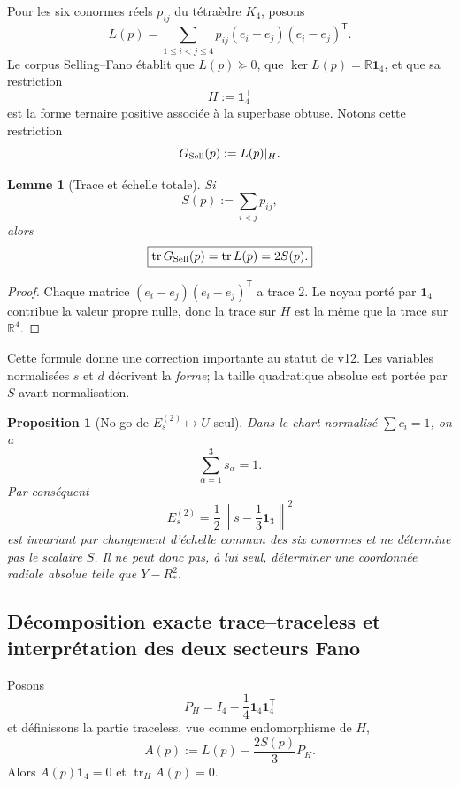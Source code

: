 \documentclass[11pt,a4paper]{article}
\newtheorem{proposition}[theorem]{Proposition}
\newtheorem{lemma}[theorem]{Lemme}
\newcommand{\R}{\mathbb R}
\begin{document}
Pour les six conormes réels $p_{ij}$ du tétraèdre $K_4$, posons
\begin{equation}\label{eq:v13-Lselling}
 L(p)
 =
 \sum_{1\le i<j\le4}
 p_{ij}(e_i-e_j)(e_i-e_j)^{\mathsf T}.
\end{equation}
Le corpus Selling--Fano établit que $L(p)\succeq0$, que
$\ker L(p)=\R\mathbf1_4$, et que sa restriction
\[
 H:=\mathbf1_4^\perp
\]
est la forme ternaire positive associée à la superbase obtuse. Notons cette restriction
\[
 G_{\rm Sell}(p):=L(p)|_H.
\]

\begin{lemma}[Trace et échelle totale]\label{lem:v13-trace}
Si
\[
 S(p):=\sum_{i<j}p_{ij},
\]
alors
\begin{equation}\label{eq:v13-trace}
 \boxed{
 \operatorname{tr}G_{\rm Sell}(p)
 =
 \operatorname{tr}L(p)
 =
 2S(p).}
\end{equation}
\end{lemma}

\begin{proof}
Chaque matrice $(e_i-e_j)(e_i-e_j)^{\mathsf T}$ a trace $2$. Le noyau porté par $\mathbf1_4$ contribue la valeur propre nulle, donc la trace sur $H$ est la même que la trace sur $\R^4$.
\end{proof}

Cette formule donne une correction importante au statut de v12. Les variables normalisées $s$ et $d$ décrivent la \emph{forme}; la taille quadratique absolue est portée par $S$ avant normalisation.

\begin{proposition}[No-go de $E_s^{(2)}\mapsto U$ seul]\label{prop:v13-Es-U-nogo}
Dans le chart normalisé $\sum c_i=1$, on a
\[
 \sum_{\alpha=1}^{3}s_\alpha=1.
\]
Par conséquent
\[
 E_s^{(2)}
 =
 \frac12\left\|s-\frac13\mathbf1_3\right\|^2
\]
est invariant par changement d'échelle commun des six conormes et ne détermine pas le scalaire $S$. Il ne peut donc pas, à lui seul, déterminer une coordonnée radiale absolue telle que $Y-R_*^2$.
\end{proposition}

\subsection{Décomposition exacte trace--traceless et interprétation des deux secteurs Fano}

Posons
\[
 P_H=I_4-\frac14\mathbf1_4\mathbf1_4^{\mathsf T}
\]
et définissons la partie traceless, vue comme endomorphisme de $H$,
\begin{equation}\label{eq:v13-A}
 A(p)
 :=
 L(p)-\frac{2S(p)}3P_H.
\end{equation}
Alors $A(p)\mathbf1_4=0$ et
$\operatorname{tr}_H A(p)=0$.
\end{document}
